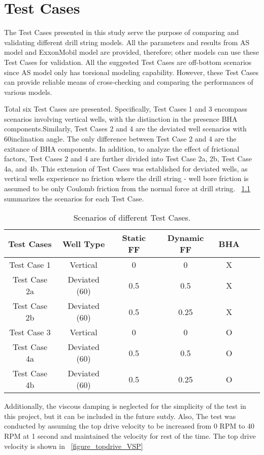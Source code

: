 \chapter{Test Cases}
\label{ch:testcases}
The Test Cases presented in this study serve the purpose of comparing and validating different drill string models. All the parameters and results from AS model and ExxonMobil model are provided, therefore; other models can use these Test Cases for validation. All the suggested Test Cases are off-bottom scenarios since AS model only has torsional modeling capability. However, these Test Cases can provide reliable means of cross-checking and comparing the performances of various models. 

Total six Test Cases are presented. Specifically, Test Cases 1 and 3 encompass scenarios involving vertical wells, with the distinction in the presence BHA components.Similarly, Test Cases 2 and 4 are the deviated well scenarios with 60\textdegree inclination angle. The only difference between Test Case 2 and 4 are the exitance of BHA components. In addition, to analyze the effect of frictional factors, Test Cases 2 and 4 are further divided into Test Case 2a, 2b, Test Case 4a, and 4b. This extension of Test Cases was established for deviated wells, as vertical wells experience no friction where the drill string - well bore friction is assumed to be only Coulomb friction from the normal force at drill string. \tablename~\ref{Test_case_summary} summarizes the scenarios for each Test Case. 


\begin{table}[!hbt]
    \centering
    \begin{tabular}{|c|c|c|c|c|c|c|}
        \hline
        \textbf{Test Cases} & \textbf{Well Type} & \textbf{Static FF} & \textbf{Dynamic FF}& \textbf{BHA}\\
        \hline
        Test Case 1 & Vertical & 0 & 0 & X\\
        \hline
        Test Case 2a & Deviated (60\textdegree{}) & 0.5 & 0.5 & X \\
        \hline
        Test Case 2b & Deviated (60\textdegree{}) & 0.5 & 0.25 & X \\
        \hline
        Test Case 3 & Vertical & 0 & 0 & O\\                                                
        \hline
        Test Case 4a & Deviated (60\textdegree{}) & 0.5 & 0.5 & O \\                                                  
        \hline
        Test Case 4b & Deviated (60\textdegree{}) & 0.5 & 0.25 & O \\                                                     
        \hline
    \end{tabular}
    \caption[Scenarios of different Test Cases]{Scenarios of different Test Cases.}
    \label{Test_case_summary}
\end{table} 
Additionally, the viscous damping is neglected for the simplicity of the test in this project, but it can be included in the future sutdy. Also, The test was conducted by assuming the top drive velocity to be increased from 0 RPM to 40 RPM at 1 second and maintained the velocity for rest of the time. The top drive velocity is shown in \figurename~\ref{figure_topdrive_VSP}

